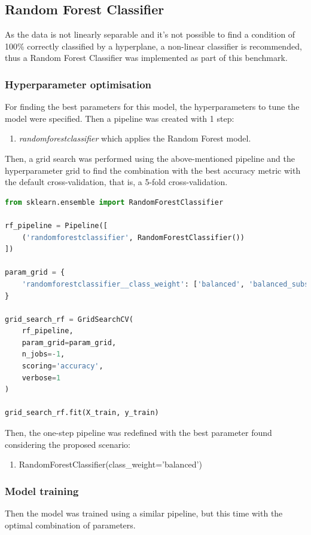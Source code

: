 \documentclass{article}
\begin{document}
\subsection{Random Forest Classifier} 
As the data is not linearly separable and it's not possible to find a condition of 100\% correctly classified by a hyperplane, a non-linear classifier is recommended, thus a Random Forest Classifier was implemented as part of this benchmark.

\subsubsection{Hyperparameter optimisation}
For finding the best parameters for this model, the hyperparameters to tune the model were specified. Then a pipeline was created with 1 step:
\begin{enumerate}
\item \emph{randomforestclassifier} which applies the Random Forest model.
\end{enumerate}

Then, a grid search was performed using the above-mentioned pipeline and the hyperparameter grid to find the combination with the best accuracy metric with the default cross-validation, that is, a 5-fold cross-validation.
\begin{lstlisting}[language=Python]
from sklearn.ensemble import RandomForestClassifier

rf_pipeline = Pipeline([
    ('randomforestclassifier', RandomForestClassifier())
])

param_grid = {
    'randomforestclassifier__class_weight': ['balanced', 'balanced_subsample']
}

grid_search_rf = GridSearchCV(
    rf_pipeline,
    param_grid=param_grid,
    n_jobs=-1,
    scoring='accuracy',
    verbose=1
)

grid_search_rf.fit(X_train, y_train)
\end{lstlisting}

Then, the one-step pipeline was redefined with the best parameter found considering the proposed scenario:
\begin{enumerate}    
    \item RandomForestClassifier(class\_weight='balanced')
\end{enumerate}

\subsubsection{Model training}
Then the model was trained using a similar pipeline, but this time with the optimal combination of parameters.
\end{document}
